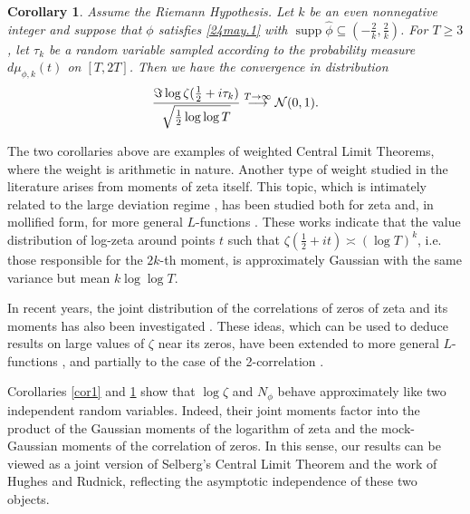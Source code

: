 \documentclass[12pt,oneside,english,a4paper]{amsart}
\newtheorem{cor}[thm]{Corollary}
\theoremstyle{remark}
\numberwithin{equation}{section}
\newcommand{\supp}{\operatorname{supp}}
\begin{document}
\begin{cor}\label{cor2}
Assume the Riemann Hypothesis. Let $k$ be an even nonnegative integer and suppose that $\phi$ satisfies \eqref{24may.1} with $\supp \hat\phi \subseteq (-\frac{2}{k},\frac{2}{k})$. For $T \ge 3$, let $\tau_k$ be a random variable sampled according to the probability measure $d\mu_{\phi,k}(t)$ on $[T,2 T]$. Then we have the convergence in distribution
\begin{equation}\label{10june.2}\notag
    \frac{\Im \log \zeta ( \tfrac12 + i \tau_k)}{\sqrt{\frac{1}{2} \log \log T}} \overset{T \to \infty}{\longrightarrow} \mathcal{N}(0,1).
\end{equation}
\end{cor}

The two corollaries above are examples of weighted Central Limit Theorems, where the weight is arithmetic in nature. Another type of weight studied in the literature arises from moments of zeta itself. This topic, which is intimately related to the large deviation regime \cite{Radziwill1,ArguinBailey,ArguinBailey2}, has been studied both for zeta \cite{FazzariWCLT1, FazzariWCLT2} and, in mollified form, for more general $L$-functions \cite{BELP}. These works indicate that the value distribution of log-zeta around points $t$ such that $\zeta(\frac12+it)\asymp (\log T)^k$, i.e. those responsible for the $2k$-th moment, is approximately Gaussian with the same variance but mean $k\log\log T$.

In recent years, the joint distribution of the correlations of zeros of zeta and its moments has also been investigated \cite{FazzariW1LD,BettinFazza}. These ideas, which can be used to deduce results on large values of $\zeta$ near its
zeros, have been extended to more general $L$-functions \cite{FazzariW1LD, Su-Su, Sugiyama,Zhao}, and partially to the case of the 2-correlation \cite{FazzariWPC}.

Corollaries \ref{cor1} and \ref{cor2} show that $\log\zeta$ and $N_\phi$ behave approximately like two independent random variables. Indeed, their joint moments factor into the product of the Gaussian moments of the logarithm of zeta and the mock-Gaussian moments of the correlation of zeros. In this sense, our results can be viewed as a joint version of Selberg's Central Limit Theorem and the work of Hughes and Rudnick, reflecting the asymptotic independence of these two objects.
\end{document}
